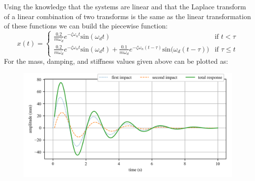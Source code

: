 \documentclass[12pt,letter]{article}
\begin{document}
\begin{example}
	Using the knowledge that the systems are linear and that the Laplace transform of a linear combination of two transforms is the same as the linear transformation of these functions we can build the piecewise function:
	\begin{equation}
	x(t) = 
	\begin{cases}
		\frac{0.2}{m \omega_d} e^{-\zeta \omega_n t} \text{sin}(\omega_dt) & \text{if } t < \tau \\
		\frac{0.2}{m \omega_d} e^{-\zeta \omega_n t} \text{sin}(\omega_dt)  + \frac{0.1}{m \omega_d} e^{-\zeta \omega_n (t-\tau)} \text{sin}\big(\omega_d(t-\tau)\big) & \text{if } \tau \leq t 
	\end{cases}
	\end{equation}
	For the mass, damping, and stiffness values given above can be plotted as:
	\begin{figure}[H]
		\centering
		\includegraphics[width=6in]{../figures/response_double_impact.png}
	\end{figure}
	
\end{example}
\end{document}
